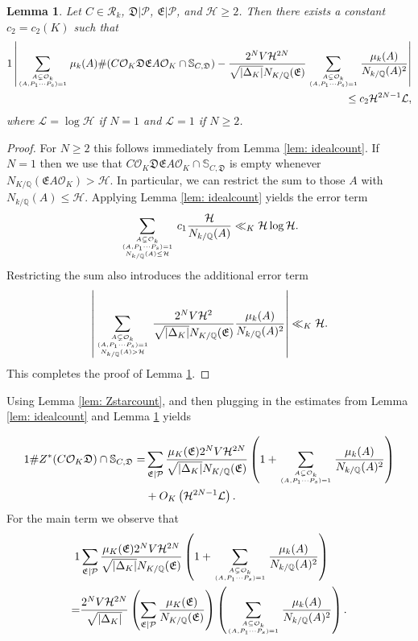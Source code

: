 \documentclass[11pt]{amsart}
\newtheorem{lemma}{Lemma}[section]
\numberwithin{equation}{eqncounter}
\def\IQ{\mathbb Q}
\def\IS{\mathbb S}
\def\Pc{\mathcal{P}}
\def\IL{\mathcal{L}}
\def\H{\mathcal{H}}
\def\R{\mathcal{R}}
\def\D{\mathfrak{D}}
\def\E{\mathfrak{E}}
\def\Zstar{Z^*}
\def\Oseen{{\mathcal{O}}}
\begin{document}
\begin{lemma}\label{lem: ZstarSCDcount}
Let $C\in \R_k$, $\D|\Pc$,  $\E|\Pc$, and $\H\geq 2$.
Then there exists a constant $c_2=c_2(K)$ such that
\begin{alignat*}1
\left|\sum_{A\subsetneq \Oseen_k \atop (A,P_1\cdots P_s)=1}\mu_k(A)\#(C\Oseen_K\D\E A\Oseen_K\cap \IS_{C,\D})-
\frac{2^N V\H^{2N}}{\sqrt{|\Delta_K|}N_{K/\IQ}(\E)}\sum_{A\subsetneq \Oseen_k \atop (A,P_1\cdots P_s)=1}\frac{\mu_k(A)}{N_{k/\IQ}(A)^2}\right| \\
\leq  c_2 \H^{2N-1}\IL,
\end{alignat*}
where $\IL=\log \H$ if $N=1$ and $\IL=1$ if $N\geq 2$.
\end{lemma}
\begin{proof}
For $N\geq 2$ this follows immediately from Lemma \ref{lem: idealcount}. If $N=1$ then we 
use that $C\Oseen_K\D\E A\Oseen_K\cap \IS_{C,\D}$ is empty whenever $N_{K/\IQ}(\E A\Oseen_K)>\H$. In particular, 
we can restrict the sum to those $A$ with $N_{k/\IQ}(A)\leq \H$. Applying Lemma \ref{lem: idealcount}
yields the error term 
$$\sum_{A\subsetneq \Oseen_k \atop {(A,P_1\cdots P_s)=1\atop N_{k/\IQ}(A)\leq \H}} c_1\frac{\H}{N_{k/\IQ}(A)}\ll_{K} \H\log \H.$$
Restricting the sum also  introduces the additional error term 
$$\left|\sum_{A\subsetneq \Oseen_k \atop {(A,P_1\cdots P_s)=1\atop N_{k/\IQ}(A)>\H}}
\frac{2^N V\H^{2}}{\sqrt{|\Delta_K|}N_{K/\IQ}(\E)}\frac{\mu_k(A)}{N_{k/\IQ}(A)^2}\right|\ll_{K}\H.$$
This completes the proof of Lemma \ref{lem: ZstarSCDcount}.
\end{proof}

Using 
Lemma \ref{lem: Zstarcount}, and then plugging in the estimates from Lemma \ref{lem: idealcount} and Lemma \ref{lem: ZstarSCDcount}
yields

\begin{alignat*}1
\#\Zstar(C\Oseen_K\D)\cap \IS_{C,\D}=&
\sum_{\E|\Pc}\frac{\mu_K(\E) 2^N V\H^{2N}}{\sqrt{|\Delta_K|}N_{K/\IQ}(\E)} \left(
1+\sum_{A\subsetneq \Oseen_k \atop (A,P_1\cdots P_s)=1}\frac{\mu_k(A)}{N_{k/\IQ}(A)^2}\right)\\
&+O_{K}\left(\H^{2N-1}\IL\right).
\end{alignat*}
For the main term we observe that 
\begin{alignat*}1
&\sum_{\E|\Pc}\frac{\mu_K(\E) 2^N V\H^{2N}}{\sqrt{|\Delta_K|}N_{K/\IQ}(\E)} \left(
1+\sum_{A\subsetneq \Oseen_k \atop (A,P_1\cdots P_s)=1}\frac{\mu_k(A)}{N_{k/\IQ}(A)^2}\right)\\
=&\frac{2^N V\H^{2N}}{\sqrt{|\Delta_K|}} 
\left(\sum_{\E|\Pc}\frac{\mu_K(\E)}{N_{K/\IQ}(\E)}\right)
\left(\sum_{A\subseteq \Oseen_k \atop (A,P_1\cdots P_s)=1}\frac{\mu_k(A)}{N_{k/\IQ}(A)^2}\right).
\end{alignat*}
\end{document}
